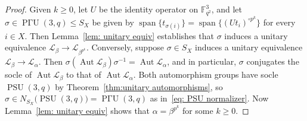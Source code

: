 \begin{proof}
Given $k \geq 0$, let $U$ be the identity operator on $\mathbb{F}_{q^2}^3$, and let $\sigma \in \operatorname{P\text{$\Gamma$}U}(3,q) \leq S_X$ be given by $\operatorname{span}\{t_{\sigma(i)}\} = \operatorname{span}\{(U t_i)^{\circ p^k}\}$ for every $i \in X$.
Then Lemma~\ref{lem: unitary equiv} establishes that $\sigma$ induces a unitary equivalence $\mathscr{L}_\beta \to \mathscr{L}_{\beta^{p^k}}$.
Conversely, suppose $\sigma \in S_X$ induces a unitary equivalence $\mathscr{L}_\beta \to \mathscr{L}_\alpha$.
Then $\sigma ( \operatorname{Aut} \mathscr{L}_\beta ) \sigma^{-1} = \operatorname{Aut} \mathscr{L}_\alpha$, and in particular, $\sigma$ conjugates the socle of $\operatorname{Aut} \mathscr{L}_\beta$ to that of $\operatorname{Aut} \mathscr{L}_\alpha$.
Both automorphism groups have socle $\operatorname{PSU}(3,q)$ by Theorem~\ref{thm:unitary automorphisms}, so $\sigma \in N_{S_X}\bigl( \operatorname{PSU}(3,q) \bigr) = \operatorname{P\text{$\Gamma$}U}(3,q)$ as in~\eqref{eq: PSU normalizer}.
Now Lemma~\ref{lem: unitary equiv} shows that $\alpha = \beta^{p^k}$ for some $k \geq 0$.
\end{proof}
